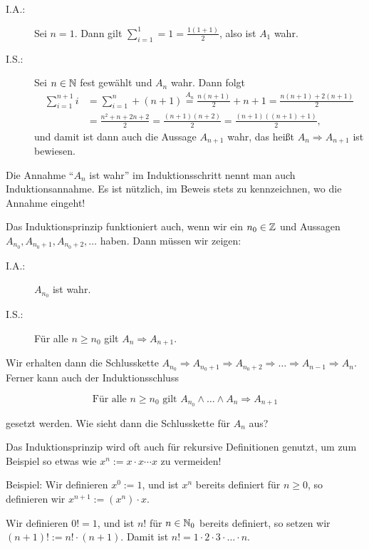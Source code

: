\begin{beweis}
	\begin{description}
		\item[I.A.:] Sei $n=1$.
		Dann gilt $\sum_{i=1}^{1} = 1 = \frac{1(1+1)}{2}$, also ist $A_1$ wahr.
		\item[I.S.:] Sei $n \in \mathbb{N}$ fest gewählt und $A_n$ wahr.
		Dann folgt
		\begin{align*}
			\sum_{i=1}^{n+1} i &= \sum_{i=1}^{n} + (n+1) \stackrel{A_n}{=} \frac{n(n+1)}{2} + n+1 = \frac{n(n+1)+2(n+1)}{2} \\
			&= \frac{n^2 +n +2n +2}{2} = \frac{(n+1)(n+2)}{2} = \frac{(n+1)((n+1)+1)}{2},
		\end{align*}
		und damit ist dann auch die Aussage $A_{n+1}$ wahr, das heißt $A_n \Rightarrow A_{n+1}$ ist bewiesen. 
	\end{description}
\end{beweis}

Die Annahme \enquote{$A_n$ ist wahr} im Induktionsschritt nennt man auch Induktionsannahme.
Es ist nützlich, im Beweis stets zu kennzeichnen, wo die Annahme eingeht!

\begin{bemerkung}
	\label{bem:I.1.10}
	Das Induktionsprinzip funktioniert auch, wenn wir ein $n_0 \in \mathbb{Z}$ und Aussagen $A_{n_0}, A_{n_0+1}, A_{n_0+2},\dots$ haben.
	Dann müssen wir zeigen:
	\begin{description}
		\item[I.A.:] $A_{n_0}$ ist wahr.
		\item[I.S.:] Für alle $n \geq n_0$ gilt $A_n \Rightarrow A_{n+1}$.
	\end{description}
	Wir erhalten dann die Schlusskette $A_{n_0} \Rightarrow A_{n_0+1} \Rightarrow A_{n_0+2} \Rightarrow \dots \Rightarrow A_{n-1} \Rightarrow A_n$.	
	Ferner kann auch der Induktionsschluss
	
	\[
		\text{Für alle } n \geq n_0 \text{ gilt } A_{n_0} \wedge \dots \wedge A_n \Rightarrow A_{n+1}
	\]
	
	gesetzt werden.
	Wie sieht dann die Schlusskette für $A_n$ aus?
\end{bemerkung}

\begin{beispiel}
	\label{bsp:I.1.11}
	Das Induktionsprinzip wird oft auch für rekursive Definitionen genutzt, um zum Beispiel so etwas wie $x^n := x \cdot x \cdots x$ zu vermeiden!
	
	Beispiel: Wir definieren $x^0 := 1$, und ist $x^n$ bereits definiert für $n \geq 0$, so definieren wir $x^{n+1} := (x^n) \cdot x$.
	
	Wir definieren $0! = 1$, und ist $n!$ für $n \in \mathbb{N}_0$ bereits definiert, so setzen wir $(n+1)! := n! \cdot (n+1)$.
	Damit ist $n! = 1 \cdot 2 \cdot 3 \cdot \dots \cdot n$.
\end{beispiel}


